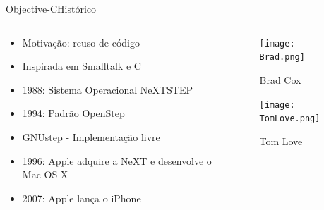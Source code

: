 \documentclass[compress]{beamer}
\begin{document}
\begin{frame}{Objective-C}{Histórico}
    \begin{columns}[T] %
    \begin{column}[T]{.8\textwidth} %
        \begin{minipage}[c][.7\textheight][c]{\linewidth}
            \begin{itemize}
                \item {   
                  Motivação: reuso de código
                }
                \item {
                  Inspirada em Smalltalk e C
                }
                \item {
                  1988: Sistema Operacional NeXTSTEP
                }
                \item {
                  1994: Padrão OpenStep
                }
                \item {
                  GNUstep - Implementação livre
                }
                \item {
                  1996: Apple adquire a NeXT e desenvolve o Mac OS X
                }
                \item {
                  2007: Apple lança o iPhone
                }
            \end{itemize}
        \end{minipage}
    \end{column}
    \begin{column}[T]{.2\textwidth} %
        \begin{figure}
        \centering
        \texttt{[image: Brad.png]}
        \caption{Brad Cox}
        \texttt{[image: TomLove.png]}
        \caption{Tom Love}
        \end{figure}
    \end{column}
    \end{columns}
\end{frame}
\end{document}
